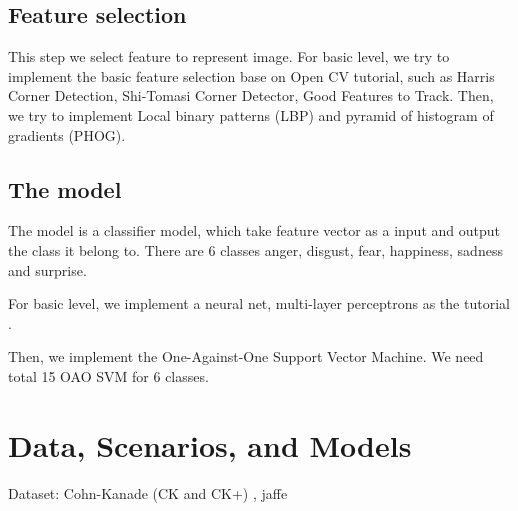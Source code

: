 \documentclass[a4paper, 12pt]{article}
\begin{document}
\subsection{Feature selection}
	This step we select feature to represent image. 
	For basic level, we try to implement the basic feature selection base on Open CV tutorial, such as Harris Corner Detection, Shi-Tomasi Corner Detector, Good Features to Track. 
	Then, we try to implement Local binary patterns (LBP) and pyramid of histogram of gradients (PHOG). 
	
\subsection{The model}
	The model is a classifier model, which take feature vector as a input and output the class it belong to. There are 6 classes anger, disgust, fear, happiness, sadness and surprise.
	
	For basic level, we implement a neural net, multi-layer perceptrons as the tutorial \cite{mlp}.
	
	Then, we implement the One-Against-One Support Vector Machine. We need total 15 OAO SVM for 6 classes.
	

\section{Data, Scenarios, and Models}
Dataset: Cohn-Kanade (CK and CK+) \cite{5543262}, jaffe \cite{lyons1998japanese}





\end{document}
